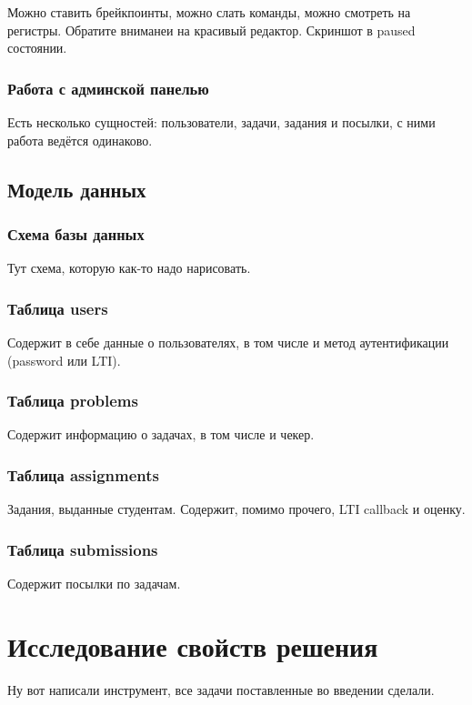 \documentclass[a4paper,article,14pt]{extarticle}
\begin{document}
Можно ставить брейкпоинты, можно слать команды, можно смотреть на регистры. Обратите вниманеи на красивый редактор. Скриншот в paused состоянии.

\subsubsection{Работа с админской панелью}

Есть несколько сущностей: пользователи, задачи, задания и посылки, с ними работа ведётся одинаково.

\subsection{Модель данных}

\subsubsection{Схема базы данных}

Тут схема, которую как-то надо нарисовать.

\subsubsection{Таблица users}

Содержит в себе данные о пользователях, в том числе и метод аутентификации (password или LTI).

\subsubsection{Таблица problems}

Содержит информацию о задачах, в том числе и чекер.

\subsubsection{Таблица assignments}

Задания, выданные студентам. Содержит, помимо прочего, LTI callback и оценку.

\subsubsection{Таблица submissions}

Содержит посылки по задачам.

\section{Исследование свойств решения}


Ну вот написали инструмент, все задачи поставленные во введении сделали.

\begin{thebibliography}{1}
\end{thebibliography}
\end{document}
